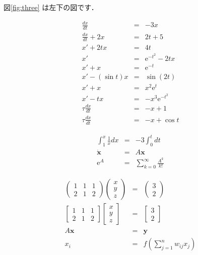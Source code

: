 \documentclass[a4paper,11pt,dvipdfmx]{jarticle}
\begin{document}
図\ref{fig:three} は左下の図です．

\lhead{}
\rhead{}


\begin{eqnarray}
\frac{dx}{dt}   & = &  - 3x \\
\frac{dx}{dt}  +2x  & = & 2t + 5 \\
x' + 2tx & = & 4t  \\
x' & = & \mathrm{e}^{-t^2} -2tx \\
x' + x & = &  \mathrm{e}^{-t} \\
x' - (\sin t) x  & = &  \sin (2t) \\
x' + x  & = &  x^2 \mathrm{e}^t \\
x' - tx   & = &  - x^3 \mathrm{e}^{-t^2}  \\
\tau \frac{dx}{dt} & = &   -x + 1 \\
\tau \frac{dx}{dt} & = &   -x + \cos t 
\end{eqnarray}

\vskip 1mm

\begin{eqnarray}
\int_1^{x} \frac{1}{x}dx   & = &  - 3 \int_0^t dt \\
\dot {\bm{x}} & = & A \bm{x} \\
\mathrm{e}^{A} & = & \sum_{k=0}^\infty \frac{A^k}{k!}
\end{eqnarray}

\begin{eqnarray}
\begin{pmatrix}
1 & 1 & 1 \\
2 & 1 & 2
\end{pmatrix}
\begin{pmatrix}
x \\
y \\
z
\end{pmatrix} 
& = &
\begin{pmatrix}
3 \\
2
\end{pmatrix}
\\
\begin{bmatrix}
1 & 1 & 1 \\
2 & 1 & 2
\end{bmatrix}
\begin{bmatrix}
x \\
y \\
z
\end{bmatrix} 
& = &
\begin{bmatrix}
3 \\
2
\end{bmatrix}
\\
A \bm{x}  & = & \bm{y}
\\
x_i & = & f(\sum_{j=1}^n w_{ij}  x_j )
\end{eqnarray}
\end{document}
